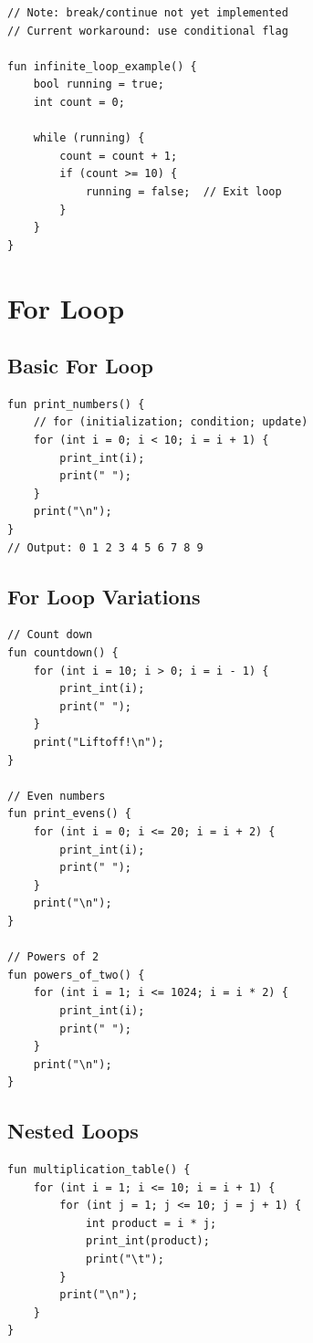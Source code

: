 \documentclass[12pt,a4paper,oneside]{book}
\begin{document}
\begin{lstlisting}[style=algo]
// Note: break/continue not yet implemented
// Current workaround: use conditional flag

fun infinite_loop_example() {
    bool running = true;
    int count = 0;
    
    while (running) {
        count = count + 1;
        if (count >= 10) {
            running = false;  // Exit loop
        }
    }
}
\end{lstlisting}

\section{For Loop}

\subsection{Basic For Loop}

\begin{lstlisting}[style=algo, caption={For Loop Syntax}]
fun print_numbers() {
    // for (initialization; condition; update)
    for (int i = 0; i < 10; i = i + 1) {
        print_int(i);
        print(" ");
    }
    print("\n");
}
// Output: 0 1 2 3 4 5 6 7 8 9
\end{lstlisting}

\subsection{For Loop Variations}

\begin{lstlisting}[style=algo, caption={For Loop Examples}]
// Count down
fun countdown() {
    for (int i = 10; i > 0; i = i - 1) {
        print_int(i);
        print(" ");
    }
    print("Liftoff!\n");
}

// Even numbers
fun print_evens() {
    for (int i = 0; i <= 20; i = i + 2) {
        print_int(i);
        print(" ");
    }
    print("\n");
}

// Powers of 2
fun powers_of_two() {
    for (int i = 1; i <= 1024; i = i * 2) {
        print_int(i);
        print(" ");
    }
    print("\n");
}
\end{lstlisting}

\subsection{Nested Loops}

\begin{lstlisting}[style=algo, caption={Multiplication Table}]
fun multiplication_table() {
    for (int i = 1; i <= 10; i = i + 1) {
        for (int j = 1; j <= 10; j = j + 1) {
            int product = i * j;
            print_int(product);
            print("\t");
        }
        print("\n");
    }
}
\end{lstlisting}
\end{document}
